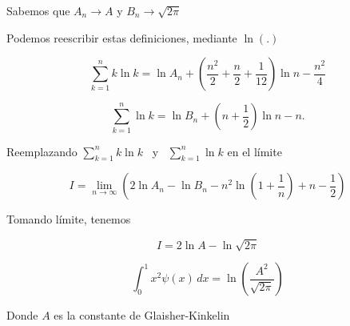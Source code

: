 {	Sabemos que $A_n \rightarrow A$ y $B_n\rightarrow \sqrt{2\pi}$ 
	
	Podemos reescribir estas definiciones, mediante $\ln (.)$
	
	$$
		\sum_{k=1}^{n} k \ln k
		= \ln A_n + \left( \frac{n^2}{2} + \frac{n}{2} + \frac{1}{12} \right) \ln n - \frac{n^2}{4} 
		$$
		
		$$
		\sum_{k=1}^{n} \ln k
		= \ln B_n + \left(n + \frac{1}{2}\right) \ln n - n.
	$$
	
	
	
	
	
	
	Reemplazando  $ \displaystyle \sum_{k=1}^{n} k \ln k$  \, y \,  $\displaystyle\sum_{k=1}^{n} \ln k $ en el límite 
	
	$$
	I= \lim_{n\to\infty} \left(2\ln A_n - \ln B_n - n^2 \ln\left(1+\frac{1}{n}\right) + n - \frac{1}{2} \right)
	$$
	
	Tomando límite, tenemos 
	
	$$
	I= 2\ln A - \ln\sqrt{2\pi}
	$$
	
	 
	
}
\begin{LnxRptaBox}
	$$
		 \int_0^1 x^2 \psi(x) \, dx = \ln\left(\dfrac{A^2}{\sqrt{2\pi}} \right)
	$$
\end{LnxRptaBox}
Donde $A$  es la constante de Glaisher-Kinkelin \\
